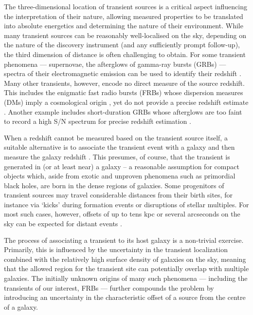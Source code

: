 \documentclass[twocolumn,linenumbers]{aastex63}
\newcommand{\stcomment}[1]{\footnote{[SPT comment: {\color{purple} #1 }]}} %
\newcommand{\atd}{\textcolor{magenta}} %
\begin{document}
The three-dimensional location of transient sources is a critical aspect influencing the interpretation of their nature, allowing measured properties to be translated into absolute energetics and determining the nature of their environment.  While many transient sources can be reasonably well-localised on the sky, depending on the nature of the discovery instrument (and any sufficiently prompt follow-up), the third dimension of distance is often challenging to obtain.
For some transient phenomena --- supernovae, the afterglows
of gamma-ray bursts (GRBs) ---
spectra of their electromagnetic emission can be used to identify their redshift \citep[e.g.][]{blondin2007,Fynbo09}.
Many other transients, however, encode no direct measure of
the source redshift.  This includes the enigmatic fast
radio bursts (FRBs) whose dispersion measures (DMs)
imply a cosmological origin \citep{Lorimer07}, yet
do not provide a precise redshift estimate 
\citep[e.g.][]{McQuinn14,xyz19}. 
Another example includes short-duration GRBs whose
afterglows are too faint to record a high S/N
spectrum for precise redshift estimation \citep[e.g.][]{Fong10}.

When a redshift cannot be measured based on the transient source itself, 
a suitable alternative is to associate the transient event with a galaxy and then measure the galaxy redshift
\citep[e.g.][]{Tendulkar17}.  
This presumes, of course,  that the transient is generated in 
(or at least near) a galaxy -- a reasonable assumption for compact objects
which, aside from exotic and unproven phenomena such as
primordial black holes,
are born in the dense regions of galaxies.
Some progenitors of transient sources may travel considerable distances from their birth sites, for instance via `kicks' during
formation events or disruptions of stellar multiples.
For most such cases, however, offsets of up to tens kpc or several arcseconds on the sky
can be expected for distant events \citep[e.g.][]{Fong13}. 

The process of associating a transient
to its host galaxy is a non-trivial exercise.  Primarily, this is influenced by the uncertainty in the transient localization combined with
the relatively high surface density of galaxies on the
sky, meaning that the allowed region for the transient site can potentially overlap with multiple galaxies.  The initially unknown origins of many such phenomena --- 
including the transients of our interest, FRBs  --- further compounds the problem by introducing an uncertainty in the characteristic offset of a source from the centre of a galaxy.
\end{document}

